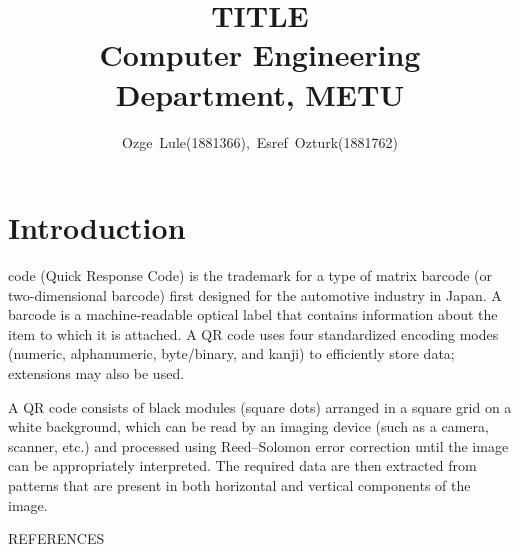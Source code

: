 \documentclass[12pt,journal,compsoc]{IEEEtran}
\begin{document}
\title{
	\huge TITLE \\     
    \Large Computer Engineering Department, METU}


\author{\normalsize Ozge~Lule(1881366),~Esref~Ozturk(1881762)}




\maketitle

\IEEEdisplaynontitleabstractindextext

\IEEEpeerreviewmaketitle

\section{Introduction}

 code (Quick Response Code) is the trademark for a type of matrix barcode (or two-dimensional barcode) first designed for the automotive industry in Japan. A barcode is a machine-readable optical label that contains information about the item to which it is attached. A QR code uses four standardized encoding modes (numeric, alphanumeric, byte/binary, and kanji) to efficiently store data; extensions may also be used.

A QR code consists of black modules (square dots) arranged in a square grid on a white background, which can be read by an imaging device (such as a camera, scanner, etc.) and processed using Reed–Solomon error correction until the image can be appropriately interpreted. The required data are then extracted from patterns that are present in both horizontal and vertical components of the image.





\begin{thebibliography}{1}

REFERENCES

\end{thebibliography}
\end{document}

